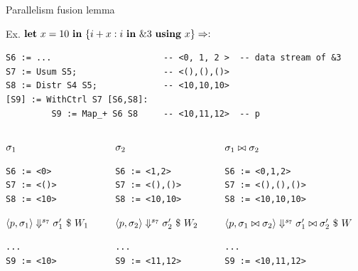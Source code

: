 \documentclass{beamer}
\begin{document}
\begin{frame}[fragile,shrink=20]{Parallelism fusion lemma}

Ex. $\mathbf{let} \ x = 10 \ \mathbf{in} \ \{i+x : i \ \mathbf{in} \ \&3 \ \mathbf{using} \ x\} \Rightarrow :$  

\begin{lstlisting}[style=svcode-style]
S6 := ...                      -- <0, 1, 2 >  -- data stream of &3         
S7 := Usum S5;                 -- <(),(),()>
S8 := Distr S4 S5;             -- <10,10,10>
[S9] := WithCtrl S7 [S6,S8]:
         S9 := Map_+ S6 S8     -- <10,11,12>  -- p
\end{lstlisting}

\begin{columns}

\begin{column}{0.25\textwidth}
	$\sigma_1$ 
	\begin{lstlisting}[style=svcode-style]
S6 := <0> 
S7 := <()>
S8 := <10>
\end{lstlisting}
$\left\langle p,\sigma_1 \right\rangle \Downarrow^{s_7} \sigma_1' \ \$ \ W_1$
\begin{lstlisting}[style=svcode-style]
...
S9 := <10>
\end{lstlisting}

\end{column}

\begin{column}{0.25\textwidth}
	$\sigma_2$ 
\begin{lstlisting}[style=svcode-style]
S6 := <1,2> 
S7 := <(),()>
S8 := <10,10>
\end{lstlisting}

$\left\langle p,\sigma_2 \right\rangle \Downarrow^{s_7} \sigma_2' \ \$ \ W_2$
\begin{lstlisting}[style=svcode-style]
...
S9 := <11,12>
\end{lstlisting}
\end{column}

	
\begin{column}{0.4\textwidth}
	$\sigma_1 \stackrel{}{\bowtie}  \sigma_2$ 
\begin{lstlisting}[style=svcode-style]
S6 := <0,1,2> 
S7 := <(),(),()>
S8 := <10,10,10>
\end{lstlisting}

$\left\langle p,\sigma_1 \stackrel{}{\bowtie} \sigma_2 \right\rangle \Downarrow^{\mathit{s}_7}  \sigma_1' \stackrel{}{\bowtie} \sigma_2'  \ \$ \ W$ 
\begin{lstlisting}[style=svcode-style]
...
S9 := <10,11,12>
\end{lstlisting}	
	
\end{column}


\end{columns}


\end{frame}
\end{document}
